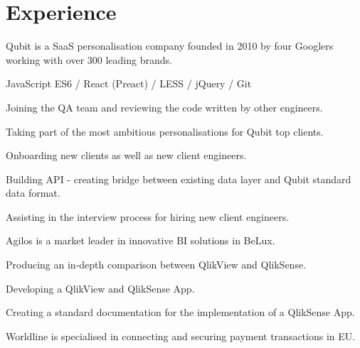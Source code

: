 \documentclass[]{my-resume}
\begin{document}
\begin{minipage}[t]{0.66\textwidth} 


\section{Experience}

Qubit is a SaaS personalisation company founded in 2010 by four Googlers working with over 300 leading brands.
\vspace{\topsep} %
\begin{tightemize}
\item JavaScript ES6 / React (Preact) / LESS / jQuery / Git
\item Joining the QA team and reviewing the code written by other engineers.
\item Taking part of the most ambitious personalisations for Qubit top clients.
\item Onboarding new clients as well as new client engineers.
\item Building API - creating bridge between existing data layer and Qubit standard data format.
\item Assisting in the interview process for hiring new client engineers.
\end{tightemize}
\sectionsep

Agilos is a market leader in innovative BI solutions in BeLux.
\begin{tightemize}
\item Producing an in-depth comparison between QlikView and QlikSense.
\item Developing a QlikView and QlikSense App.
\item Creating a standard documentation for the implementation of a QlikSense App.
\end{tightemize}
\sectionsep

Worldline is specialised in connecting and securing payment transactions in EU.
\sectionsep


\end{minipage}
\end{document}
